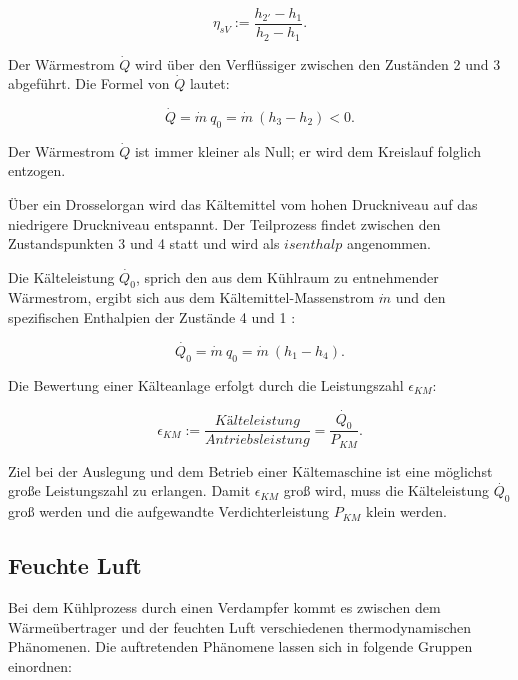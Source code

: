\begin{equation}
\eta_{sV}:= \frac{h_{2'}- h_{1}}{h_2 - h_1}.
\label{eq:Antriebsleistung}
\end{equation}


Der Wärmestrom $\dot{Q}$ wird über den Verflüssiger zwischen den Zuständen 2 und 3 abgeführt. Die Formel von  $\dot{Q}$ lautet: 

\begin{equation}
	\dot{Q} = \dot{m}~q_0 = \dot{m}~ (h_3 - h_2)< 0.
	\label{eq:Wärmestrom}
\end{equation}

Der Wärmestrom $\dot{Q}$ ist immer kleiner als Null; er wird dem Kreislauf folglich entzogen.  
 
Über ein Drosselorgan wird das Kältemittel vom hohen Druckniveau auf das niedrigere Druckniveau entspannt. Der Teilprozess findet zwischen den Zustandspunkten 3 und 4 statt und wird als $isenthalp$ angenommen.  
 
Die Kälteleistung $\dot{Q_0}$, sprich den aus dem Kühlraum zu entnehmender Wärmestrom, ergibt sich aus dem Kältemittel-Massenstrom $\dot{m}$ und den spezifischen Enthalpien der Zustände 4 und 1 :

\begin{equation}
	\dot{Q_0} = \dot{m}~ q_0 = \dot{m}~ (h_1 - h_4).
	\label{eq:Kälteleistung}
\end{equation}




Die Bewertung einer Kälteanlage erfolgt durch die Leistungszahl $\epsilon_{KM}$: 

\begin{equation}
	\epsilon_{KM} := \frac{Kälteleistung}{Antriebsleistung} =\frac{\dot{Q_0}}{P_{KM}}.
	\label{eq:Leistungszahl}
\end{equation}

Ziel bei der Auslegung und dem Betrieb einer Kältemaschine ist eine möglichst große Leistungszahl zu erlangen. Damit $\epsilon_{KM}$ groß wird, muss die Kälteleistung $\dot{Q_0}$ groß werden und die aufgewandte Verdichterleistung $P_{KM}$ klein werden. 

\subsection{Feuchte Luft}
\label{subsec:Feuchte Luft}

Bei dem Kühlprozess durch einen Verdampfer kommt es zwischen dem Wärmeübertrager und der feuchten Luft verschiedenen thermodynamischen Phänomenen. Die auftretenden Phänomene lassen sich in folgende Gruppen einordnen:

